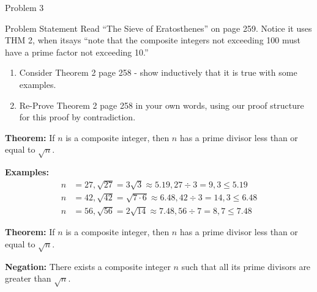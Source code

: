 \begin{problem}{Problem 3}
    \begin{statement}{Problem Statement}
        Read “The Sieve of Eratosthenes” on page 259. Notice it uses THM 2, when itsays “note that the composite integers not exceeding 100 must have a prime factor not exceeding 10.”
        \begin{enumerate}[label = (\alph*)]
            \item Consider Theorem 2 page 258 - show inductively that it is true with some examples.
            \item Re-Prove Theorem 2 page 258 in your own words, using our proof structure for this proof by contradiction.
        \end{enumerate}
    \end{statement}

    \begin{highlight}
        \noindent \textbf{Theorem:} If $n$ is a composite integer, then $n$ has a prime divisor less than or equal to $\sqrt{n}$. \vspace*{1em}

        \noindent \textbf{Examples:} 
        \begin{align*}
            n & = 27, \sqrt{27} = 3\sqrt{3} \approx 5.19, 27 \div 3 = 9, 3 \leq 5.19 \\
            n & = 42, \sqrt{42} = \sqrt{7 \cdot 6} \approx 6.48, 42 \div 3 = 14, 3 \leq 6.48 \\
            n & = 56, \sqrt{56} = 2\sqrt{14} \approx 7.48, 56 \div 7 = 8, 7 \leq 7.48
        \end{align*}
    \end{highlight}

    \begin{highlight}
        \noindent \textbf{Theorem:} If $n$ is a composite integer, then $n$ has a prime divisor less than or equal to $\sqrt{n}$. \vspace*{1em}

        \noindent \textbf{Negation:} There exists a composite integer $n$ such that all its prime divisors are greater than $\sqrt{n}$. \vspace*{1em}


\end{highlight}
\end{problem}
